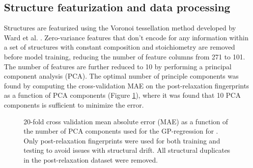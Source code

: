

\subsection{Structure featurization and data processing}  %
%


%
%
Structures are featurized using the Voronoi tessellation method developed by Ward et al. \cite{Ward2017}.
%
Zero-variance features that don't encode for any information within a set of structures with constant composition and stoichiometry are removed before model training, reducing the number of feature columns from \num{271} to \num{101}.
%
The number of features are further reduced to \num{10} by performing a principal component analysis (PCA).
%
The optimal number of principle components was found by computing the cross-validation MAE on the post-relaxation fingerprints as a function of PCA components (Figure \ref{fig:cv_anal}),
where it was found that 10 PCA components is sufficient to minimize the error.




\begin{figure}[!htb]
\centering
{}
\caption{\label{fig:cv_anal}
20-fold cross validation mean absolute error (MAE) as a function of the number of PCA components used for the GP-regression for \IrOthree.
%
Only post-relaxation fingerprints were used for both training and testing to avoid issues with structural drift.
%
All structural duplicates in the post-relaxation dataset were removed.
}
\end{figure}



